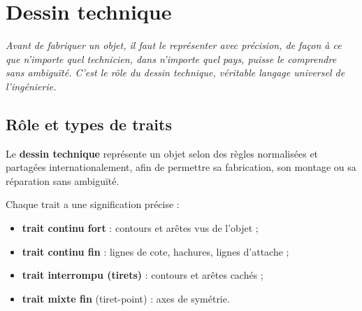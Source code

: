 \chapter{Dessin technique}

\noindent\textit{Avant de fabriquer un objet, il faut le représenter avec précision, de
façon à ce que n'importe quel technicien, dans n'importe quel pays, puisse le comprendre
sans ambiguïté. C'est le rôle du dessin technique, véritable langage universel de
l'ingénierie.}
\vspace{8pt}

\connecteBanner

\section{Rôle et types de traits}

\begin{definition}
Le \textbf{dessin technique} représente un objet selon des règles normalisées et
partagées internationalement, afin de permettre sa fabrication, son montage ou sa
réparation sans ambiguïté.
\end{definition}

\begin{propriete}
Chaque trait a une signification précise :
\begin{itemize}
\item \textbf{trait continu fort} : contours et arêtes vus de l'objet ;
\item \textbf{trait continu fin} : lignes de cote, hachures, lignes d'attache ;
\item \textbf{trait interrompu (tirets)} : contours et arêtes cachés ;
\item \textbf{trait mixte fin} (tiret-point) : axes de symétrie.
\end{itemize}
\end{propriete}

\begin{illus}
\end{illus}

